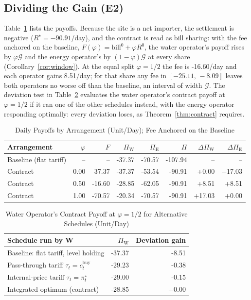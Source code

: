 \subsection{Dividing the Gain (E2)}
Table~\ref{tab:payoffs} lists the payoffs. Because the site is a net importer, the settlement is negative
($R^\star=-90.91$/day), and the contract is read as bill sharing: with the fee anchored on the baseline,
$F(\varphi)=\mathrm{bill}^0+\varphi R^0$, the water operator's payoff rises by $\varphi\mathcal{G}$ and the energy
operator's by $(1-\varphi)\mathcal{G}$ at every share (Corollary~\ref{cor:window}). At the equal split $\varphi=1/2$
the fee is -16.60/day and each operator gains 8.51/day; for that share any fee in
$[-25.11,\,-8.09]$ leaves both operators no worse off than the baseline, an interval of width
$\mathcal{G}$. The deviation test in Table~\ref{tab:deviation} evaluates the water operator's contract payoff at
$\varphi=1/2$ if it ran one of the other schedules instead, with the energy operator responding optimally: every
deviation loses, as Theorem~\ref{thm:contract} requires.

\begin{table}[!t]
\caption{Daily Payoffs by Arrangement (Unit/Day); Fee Anchored on the Baseline}
\label{tab:payoffs}
\centering
\scriptsize
\setlength{\tabcolsep}{2.5pt}
\begin{tabular}{@{}lrrrrrrr@{}}
\toprule
Arrangement & $\varphi$ & $F$ & $\Pi_{\mathrm{W}}$ & $\Pi_{\mathrm{E}}$ & $\Pi$ & $\Delta\Pi_{\mathrm{W}}$ & $\Delta\Pi_{\mathrm{E}}$ \\
\midrule
Baseline (flat tariff) & -- & -- & -37.37 & -70.57 & -107.94 & -- & -- \\
Contract & 0.00 & 37.37 & -37.37 & -53.54 & -90.91 & +0.00 & +17.03 \\
Contract & 0.50 & -16.60 & -28.85 & -62.05 & -90.91 & +8.51 & +8.51 \\
Contract & 1.00 & -70.57 & -20.34 & -70.57 & -90.91 & +17.03 & +0.00 \\
\bottomrule
\end{tabular}
\end{table}

\begin{table}[!t]
\caption{Water Operator's Contract Payoff at $\varphi=1/2$ for Alternative Schedules (Unit/Day)}
\label{tab:deviation}
\centering
\footnotesize
\setlength{\tabcolsep}{4pt}
\begin{tabular}{@{}lrr@{}}
\toprule
Schedule run by W & $\Pi_{\mathrm{W}}$ & Deviation gain \\
\midrule
Baseline: flat tariff, level holding & -37.37 & -8.51 \\
Pass-through tariff $\tau_t=c^{\mathrm{buy}}_t$ & -29.23 & -0.38 \\
Internal-price tariff $\tau_t=\pi^\star_t$ & -29.00 & -0.15 \\
Integrated optimum (contract) & -28.85 & +0.00 \\
\bottomrule
\end{tabular}
\end{table}

